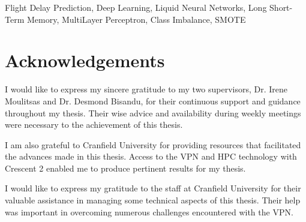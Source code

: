 \documentclass[12pt,oneside]{book} %
\begin{document}
\begin{keywords}
Flight Delay Prediction, Deep Learning, Liquid Neural Networks, Long Short-Term Memory, MultiLayer Perceptron, Class Imbalance, SMOTE
\end{keywords}

\chapter{Acknowledgements}
  
\noindent I would like to express my sincere gratitude to my two supervisors, Dr. Irene Moulitsas and Dr. Desmond Bisandu, for their continuous support and guidance throughout my thesis. Their wise advice and availability during weekly meetings were necessary to the achievement of this thesis.

\noindent I am also grateful to Cranfield University for providing resources that facilitated the advances made in this thesis. Access to the VPN and HPC technology with Crescent 2 enabled me to produce pertinent results for my thesis.

\noindent I would like to express my gratitude to the staff at Cranfield University for their valuable assistance in managing some technical aspects of this thesis. Their help was important in overcoming numerous challenges encountered with the VPN.

\clearpage
\singlespacing
{
\tableofcontents
}
\clearpage

\listoffigures

\clearpage
\listoftables
\end{document}
